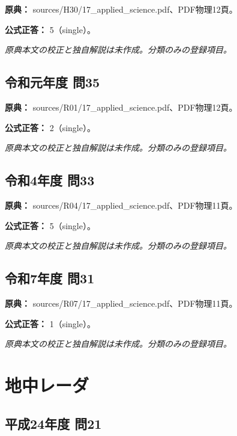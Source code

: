 \noindent\textbf{原典：} sources/H30/17\_applied\_science.pdf、PDF物理12頁。

\textbf{公式正答：} 5（single）。

\par\textit{原典本文の校正と独自解説は未作成。分類のみの登録項目。}

\subsection{令和元年度 問35}
\label{q:r01-reg-applied-35}

\noindent\textbf{原典：} sources/R01/17\_applied\_science.pdf、PDF物理12頁。

\textbf{公式正答：} 2（single）。

\par\textit{原典本文の校正と独自解説は未作成。分類のみの登録項目。}

\subsection{令和4年度 問33}
\label{q:r04-reg-applied-33}

\noindent\textbf{原典：} sources/R04/17\_applied\_science.pdf、PDF物理11頁。

\textbf{公式正答：} 5（single）。

\par\textit{原典本文の校正と独自解説は未作成。分類のみの登録項目。}

\subsection{令和7年度 問31}
\label{q:r07-reg-applied-31}

\noindent\textbf{原典：} sources/R07/17\_applied\_science.pdf、PDF物理11頁。

\textbf{公式正答：} 1（single）。

\par\textit{原典本文の校正と独自解説は未作成。分類のみの登録項目。}

\section{地中レーダ}

\subsection{平成24年度 問21}
\label{q:h24-reg-applied-21}


